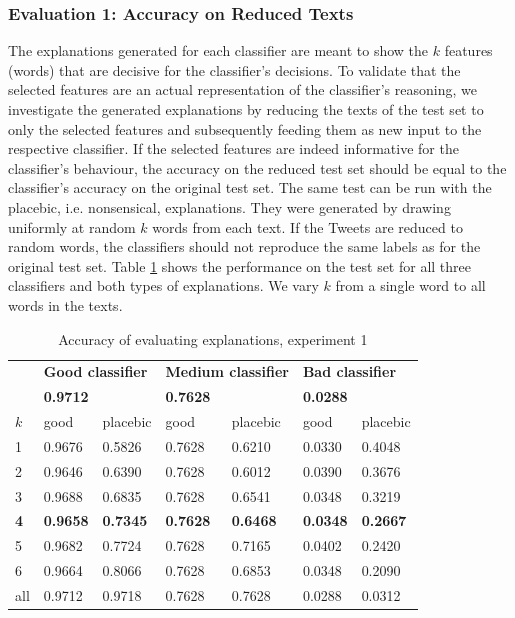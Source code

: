 \subsubsection{Evaluation 1: Accuracy on Reduced Texts}
The explanations generated for each classifier are meant to show the $k$ features (words) that are decisive for the classifier's decisions. To validate that the selected features are an actual representation of the classifier's reasoning, we investigate the generated explanations by reducing the texts of the test set to only the selected features and subsequently feeding them as new input to the respective classifier. If the selected features are indeed informative for the classifier's behaviour, the accuracy on the reduced test set should be equal to the classifier's accuracy on the original test set. The same test can be run with the placebic, i.e. nonsensical, explanations. They were generated by drawing uniformly at random $k$ words from each text. If the Tweets are reduced to random words, the classifiers should not reproduce the same labels as for the original test set.\newline
Table \ref{tab:exp1} shows the performance on the test set for all three classifiers and both types of explanations. We vary $k$ from a single word to all words in the texts.\newline
\begin{table}[H]
	\centering
	\begin{tabular}{l|m{1.4cm}m{1.4cm}|m{1.4cm}m{1.4cm}|m{1.4cm}m{1.4cm}}
		& \multicolumn{2}{l|}{\textbf{Good classifier}} & \multicolumn{2}{l|}{\textbf{Medium classifier}} & \multicolumn{2}{l}{\textbf{Bad classifier}} \\ 
		& \multicolumn{2}{l|}{\textbf{0.9712}} & \multicolumn{2}{l|}{\textbf{0.7628}} & \multicolumn{2}{l}{\textbf{0.0288}} \\ \midrule
		$k$& good & placebic & good & placebic & good & placebic \\ \midrule
		1  &  0.9676  &  0.5826  & 0.7628 & 0.6210 & 0.0330  &  0.4048  \\
		2  &  0.9646  &  0.6390  & 0.7628 & 0.6012 & 0.0390  &  0.3676  \\
		3  &  0.9688  &  0.6835  & 0.7628 & 0.6541 & 0.0348  &  0.3219  \\
		\textbf{4}  &  \textbf{0.9658}  &  \textbf{0.7345}  & \textbf{0.7628} & \textbf{0.6468} & \textbf{0.0348}  &  \textbf{0.2667}  \\
		5  &  0.9682  &  0.7724  & 0.7628 & 0.7165 & 0.0402  &  0.2420  \\
		6  &  0.9664  &  0.8066  & 0.7628 &  0.6853 & 0.0348  &  0.2090  \\
		all  &  0.9712  &  0.9718  & 0.7628 & 0.7628 & 0.0288  &  0.0312  \\ \bottomrule
	\end{tabular}
	\caption{Accuracy of evaluating explanations, experiment 1}
	\label{tab:exp1}
\end{table}
